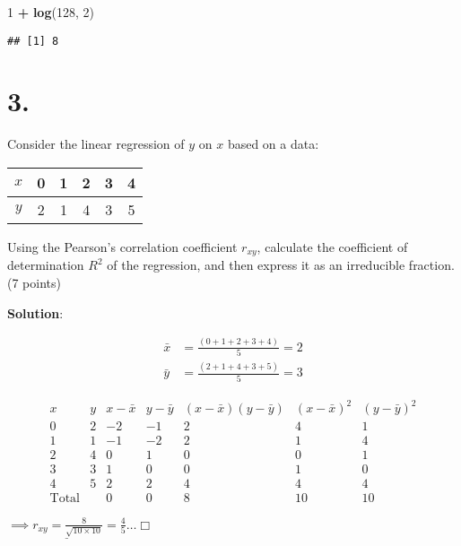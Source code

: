 \documentclass[
]{article}
\newenvironment{Shaded}{\begin{snugshade}}{\end{snugshade}}
\newcommand{\DecValTok}[1]{\textcolor[rgb]{0.00,0.00,0.81}{#1}}
\newcommand{\KeywordTok}[1]{\textcolor[rgb]{0.13,0.29,0.53}{\textbf{#1}}}
\newcommand{\NormalTok}[1]{#1}
\newcommand{\OperatorTok}[1]{\textcolor[rgb]{0.81,0.36,0.00}{\textbf{#1}}}
\newcommand{\StringTok}[1]{\textcolor[rgb]{0.31,0.60,0.02}{#1}}
\begin{document}
\begin{Shaded}
\begin{Highlighting}[]
\DecValTok{1} \OperatorTok{+}\StringTok{ }\KeywordTok{log}\NormalTok{(}\DecValTok{128}\NormalTok{, }\DecValTok{2}\NormalTok{)}
\end{Highlighting}
\end{Shaded}

\begin{verbatim}
## [1] 8
\end{verbatim}

\hypertarget{section-2}{%
\section{3.}\label{section-2}}

Consider the linear regression of \(y\) on \(x\) based on a data:

\begin{tabular}{|c|c|c|c|c|c|}
\hline 
$x$ & 0 & 1 & 2 & 3 & 4 \\
\hline 
$y$ & 2 & 1 & 4 & 3 & 5 \\
\hline
\end{tabular}

Using the Pearson's correlation coefficient \(r_{xy}\), calculate the
coefficient of determination \(R^2\) of the regression, and then express
it as an irreducible fraction. (7 points)

\textbf{Solution}:

\begin{align*} \bar{x} &= \frac{(0 + 1 + 2 + 3 + 4)}5  =2\\
\bar{y} &= \frac{(2 + 1 + 4 + 3 + 5)}5 = 3
\end{align*}

\[\begin{array}{ccccccc}
x & y & x - \bar{x} & y - \bar{y} & (x - \bar{x})(y - \bar{y}) & (x - \bar{x})^2 & (y - \bar{y})^2 \\
\hline 
0 & 2 & -2 & -1 & 2 & 4 & 1 \\
1 & 1 & -1 & -2 & 2 & 1 & 4 \\
2 & 4 & 0  &  1 & 0 & 0 & 1 \\
3 & 3 & 1  &  0 & 0 & 1 & 0 \\
4 & 5 & 2  &  2 & 4 & 4 & 4 \\
\hline 
\text{Total} && 0 & 0 & 8 & 10 & 10
\end{array}\]

\hfill\(\underline{\implies r_{xy} = \frac{8}{\sqrt{10\times 10}} = \frac{4}{5}} \ldots\Box\)
\end{document}

